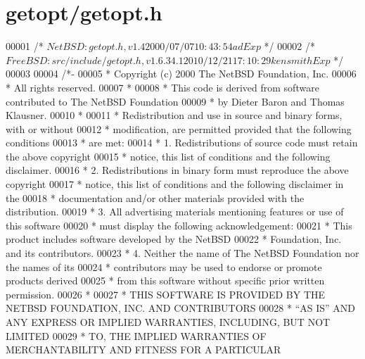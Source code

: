 \hypertarget{getopt_2getopt_8h_source}{}\section{getopt/getopt.h}
\label{getopt_2getopt_8h_source}

\begin{DoxyCode}
00001 \textcolor{comment}{/*  $NetBSD: getopt.h,v 1.4 2000/07/07 10:43:54 ad Exp $    */}
00002 \textcolor{comment}{/*  $FreeBSD: src/include/getopt.h,v 1.6.34.1 2010/12/21 17:10:29 kensmith Exp $ */}
00003 
00004 \textcolor{comment}{/*-}
00005 \textcolor{comment}{ * Copyright (c) 2000 The NetBSD Foundation, Inc.}
00006 \textcolor{comment}{ * All rights reserved.}
00007 \textcolor{comment}{ *}
00008 \textcolor{comment}{ * This code is derived from software contributed to The NetBSD Foundation}
00009 \textcolor{comment}{ * by Dieter Baron and Thomas Klausner.}
00010 \textcolor{comment}{ *}
00011 \textcolor{comment}{ * Redistribution and use in source and binary forms, with or without}
00012 \textcolor{comment}{ * modification, are permitted provided that the following conditions}
00013 \textcolor{comment}{ * are met:}
00014 \textcolor{comment}{ * 1. Redistributions of source code must retain the above copyright}
00015 \textcolor{comment}{ *    notice, this list of conditions and the following disclaimer.}
00016 \textcolor{comment}{ * 2. Redistributions in binary form must reproduce the above copyright}
00017 \textcolor{comment}{ *    notice, this list of conditions and the following disclaimer in the}
00018 \textcolor{comment}{ *    documentation and/or other materials provided with the distribution.}
00019 \textcolor{comment}{ * 3. All advertising materials mentioning features or use of this software}
00020 \textcolor{comment}{ *    must display the following acknowledgement:}
00021 \textcolor{comment}{ *        This product includes software developed by the NetBSD}
00022 \textcolor{comment}{ *        Foundation, Inc. and its contributors.}
00023 \textcolor{comment}{ * 4. Neither the name of The NetBSD Foundation nor the names of its}
00024 \textcolor{comment}{ *    contributors may be used to endorse or promote products derived}
00025 \textcolor{comment}{ *    from this software without specific prior written permission.}
00026 \textcolor{comment}{ *}
00027 \textcolor{comment}{ * THIS SOFTWARE IS PROVIDED BY THE NETBSD FOUNDATION, INC. AND CONTRIBUTORS}
00028 \textcolor{comment}{ * ``AS IS'' AND ANY EXPRESS OR IMPLIED WARRANTIES, INCLUDING, BUT NOT LIMITED}
00029 \textcolor{comment}{ * TO, THE IMPLIED WARRANTIES OF MERCHANTABILITY AND FITNESS FOR A PARTICULAR}

\end{DoxyCode}
